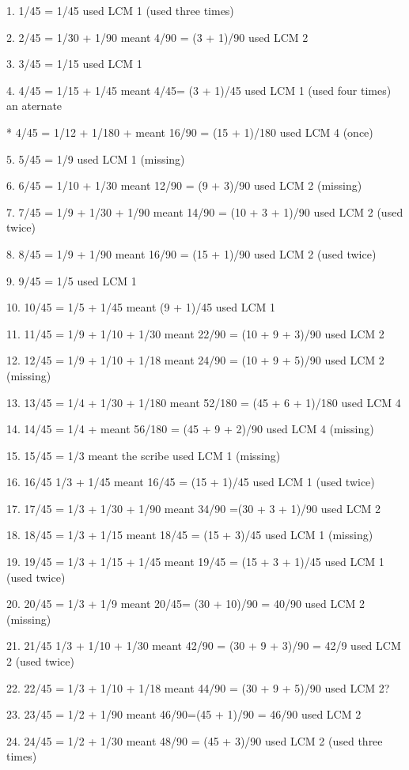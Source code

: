 \documentclass[12pt]{article}
\begin{document}
1. 1/45 = 1/45 used LCM 1 (used three times)

2. 2/45 =  1/30 + 1/90  meant 4/90 = (3 + 1)/90 used LCM 2 

3. 3/45 = 1/15 used LCM 1 

4. 4/45 = 1/15 + 1/45  meant 4/45= (3 + 1)/45 used LCM 1 (used four times) an aternate

* 4/45 = 1/12 + 1/180 + meant 16/90 = (15 + 1)/180 used LCM 4 (once)  

5. 5/45 = 1/9 used LCM 1  (missing)

6. 6/45 = 1/10 + 1/30 meant 12/90 = (9 + 3)/90 used LCM 2 (missing)

7. 7/45 = 1/9 + 1/30 + 1/90 meant 14/90 = (10 + 3 + 1)/90 used LCM 2 (used twice) 

8. 8/45 = 1/9 + 1/90 meant 16/90 = (15 + 1)/90 used LCM 2 (used twice)

9. 9/45 = 1/5 used LCM 1

10. 10/45  = 1/5 + 1/45  meant (9 + 1)/45 used LCM 1

11. 11/45 = 1/9 + 1/10 + 1/30 meant 22/90 = (10 + 9 + 3)/90 used LCM 2

12. 12/45 = 1/9 + 1/10 + 1/18  meant  24/90 = (10 + 9 + 5)/90 used LCM 2 (missing)

13. 13/45 = 1/4 + 1/30 + 1/180  meant 52/180 = (45 + 6 + 1)/180 used LCM 4

14. 14/45 = 1/4 +  meant 56/180 = (45 + 9 + 2)/90 used LCM 4  (missing)

15. 15/45 = 1/3 meant the scribe used LCM 1 (missing)

16. 16/45 1/3 + 1/45 meant 16/45 = (15 + 1)/45 used LCM 1 (used twice)

17. 17/45 = 1/3 + 1/30 + 1/90 meant 34/90 =(30 + 3 + 1)/90 used LCM 2 

18. 18/45 = 1/3 + 1/15 meant  18/45 = (15 + 3)/45 used LCM 1 (missing)

19. 19/45 = 1/3 + 1/15 + 1/45 meant 19/45 = (15 + 3 + 1)/45 used LCM 1 (used twice)

20. 20/45 = 1/3 + 1/9 meant 20/45= (30 + 10)/90 = 40/90 used LCM 2 (missing)

21. 21/45 1/3 + 1/10 + 1/30 meant 42/90 = (30 + 9 + 3)/90 = 42/9 used LCM 2 (used twice)

22. 22/45 = 1/3 + 1/10 + 1/18  meant 44/90 = (30 + 9 + 5)/90 used LCM 2? 

23. 23/45 = 1/2 + 1/90 meant  46/90=(45 + 1)/90 = 46/90 used LCM 2

24. 24/45 = 1/2 + 1/30 meant 48/90 = (45 + 3)/90 used LCM 2 (used three times)
\end{document}
